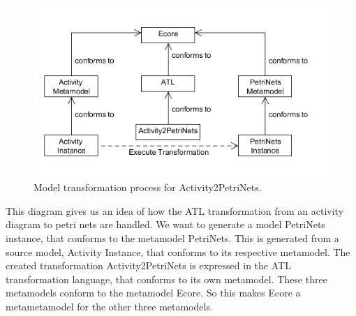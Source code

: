 \begin{figure}[H]
	\centering
	\includegraphics[scale=0.5]{figures/ATL.png}
	\caption{Model transformation process for Activity2PetriNets.}
	\label{fig:ATL}
\end{figure}

This diagram gives us an idea of how the ATL transformation from an activity
diagram to petri nets are handled. We want to generate a model PetriNets
instance, that conforms to the metamodel PetriNets. This is generated from a
source model, Activity Instance, that conforms to its respective metamodel.
The created transformation Activity2PetriNets is expressed in the ATL
transformation  language, that conforms to its own metamodel. These three
metamodels conform to the metamodel Ecore. So this makes Ecore a metametamodel
for the other three metamodels. 


